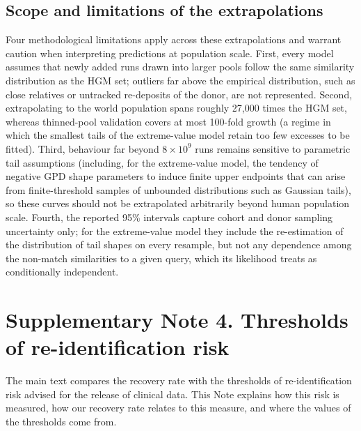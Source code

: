 \documentclass[11pt,a4paper]{article}
\begin{document}
\subsection*{Scope and limitations of the extrapolations}

Four methodological limitations apply across these extrapolations and warrant caution when interpreting predictions at population scale. First, every model assumes that newly added runs drawn into larger pools follow the same similarity distribution as the HGM set; outliers far above the empirical distribution, such as close relatives or untracked re-deposits of the donor, are not represented. Second, extrapolating to the world population spans roughly 27,000 times the HGM set, whereas thinned-pool validation covers at most 100-fold growth (a regime in which the smallest tails of the extreme-value model retain too few excesses to be fitted). Third, behaviour far beyond $8\times10^9$ runs remains sensitive to parametric tail assumptions (including, for the extreme-value model, the tendency of negative GPD shape parameters to induce finite upper endpoints that can arise from finite-threshold samples of unbounded distributions such as Gaussian tails), so these curves should not be extrapolated arbitrarily beyond human population scale. Fourth, the reported 95\% intervals capture cohort and donor sampling uncertainty only; for the extreme-value model they include the re-estimation of the distribution of tail shapes on every resample, but not any dependence among the non-match similarities to a given query, which its likelihood treats as conditionally independent.


\FloatBarrier
\section*{Supplementary Note 4. Thresholds of re-identification risk}

The main text compares the recovery rate with the thresholds of re-identification risk advised for the release of clinical data. This Note explains how this risk is measured, how our recovery rate relates to this measure, and where the values of the thresholds come from.
\end{document}
